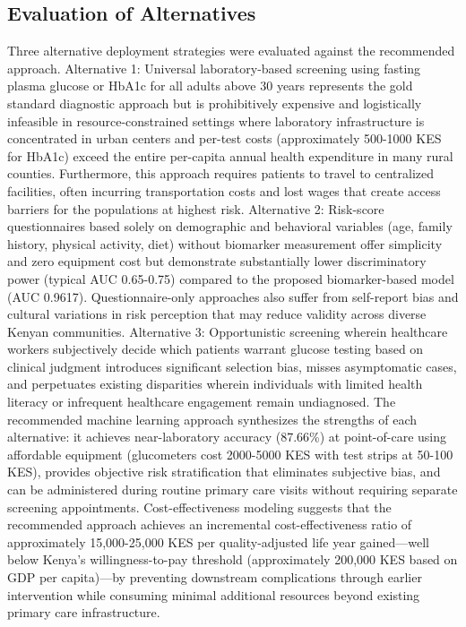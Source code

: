 \documentclass[12pt]{article}
\begin{document}
\subsection{Evaluation of Alternatives}

Three alternative deployment strategies were evaluated against the recommended approach. Alternative 1: Universal laboratory-based screening using fasting plasma glucose or HbA1c for all adults above 30 years represents the gold standard diagnostic approach but is prohibitively expensive and logistically infeasible in resource-constrained settings where laboratory infrastructure is concentrated in urban centers and per-test costs (approximately 500-1000 KES for HbA1c) exceed the entire per-capita annual health expenditure in many rural counties. Furthermore, this approach requires patients to travel to centralized facilities, often incurring transportation costs and lost wages that create access barriers for the populations at highest risk. Alternative 2: Risk-score questionnaires based solely on demographic and behavioral variables (age, family history, physical activity, diet) without biomarker measurement offer simplicity and zero equipment cost but demonstrate substantially lower discriminatory power (typical AUC 0.65-0.75) compared to the proposed biomarker-based model (AUC 0.9617). Questionnaire-only approaches also suffer from self-report bias and cultural variations in risk perception that may reduce validity across diverse Kenyan communities. Alternative 3: Opportunistic screening wherein healthcare workers subjectively decide which patients warrant glucose testing based on clinical judgment introduces significant selection bias, misses asymptomatic cases, and perpetuates existing disparities wherein individuals with limited health literacy or infrequent healthcare engagement remain undiagnosed. The recommended machine learning approach synthesizes the strengths of each alternative: it achieves near-laboratory accuracy (87.66\%) at point-of-care using affordable equipment (glucometers cost 2000-5000 KES with test strips at 50-100 KES), provides objective risk stratification that eliminates subjective bias, and can be administered during routine primary care visits without requiring separate screening appointments. Cost-effectiveness modeling suggests that the recommended approach achieves an incremental cost-effectiveness ratio of approximately 15,000-25,000 KES per quality-adjusted life year gained—well below Kenya's willingness-to-pay threshold (approximately 200,000 KES based on GDP per capita)—by preventing downstream complications through earlier intervention while consuming minimal additional resources beyond existing primary care infrastructure.
\end{document}
